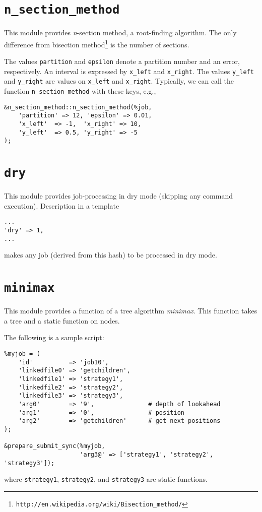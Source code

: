 \documentclass[a4paper,10pt]{report}
\begin{document}
\section{\texttt{n\_section\_method}}

This module provides \textit{n}-section method, a root-finding
algorithm. The only difference from bisection
method\footnote{\texttt{http://en.wikipedia.org/wiki/Bisection\_method/}}
is the number of sections.

The values \texttt{partition} and \texttt{epsilon} denote
    a partition number and an error, respectively.  An interval is
    expressed by \texttt{x\_left} and \texttt{x\_right}.  The values
    \texttt{y\_left} and \texttt{y\_right} are values on \texttt{x\_left}
    and \texttt{x\_right}.  Typically, we can call the function
    \texttt{n\_section\_method} with these keys, e.g.,
\begin{boxnote}
\begin{verbatim}
&n_section_method::n_section_method(%job,
    'partition' => 12, 'epsilon' => 0.01,
    'x_left'  => -1,  'x_right' => 10,
    'y_left'  => 0.5, 'y_right' => -5
);
\end{verbatim}
\end{boxnote}

\section{\texttt{dry}}

This module provides job-processing in dry mode (skipping any command
execution).  Description in a template
\begin{boxnote}
\begin{verbatim}
...
'dry' => 1,
...
\end{verbatim}
\end{boxnote}
\noindent
makes any job (derived from this hash) to be processed in dry mode.

\section{\texttt{minimax}}

This module provides a function of a tree algorithm \textit{minimax}.
This function takes a tree and a static function on nodes.

The following is a sample script:
\begin{boxnote}
\begin{verbatim}
%myjob = (
    'id'          => 'job10',
    'linkedfile0' => 'getchildren',
    'linkedfile1' => 'strategy1',
    'linkedfile2' => 'strategy2',
    'linkedfile3' => 'strategy3',
    'arg0'        => '9',               # depth of lookahead
    'arg1'        => '0',               # position
    'arg2'        => 'getchildren'      # get next positions
);

&prepare_submit_sync(%myjob,
                     'arg3@' => ['strategy1', 'strategy2', 'strategy3']);
\end{verbatim}
\end{boxnote}
\noindent
where \texttt{strategy1}, \texttt{strategy2}, and
\texttt{strategy3} are static functions.
\end{document}
